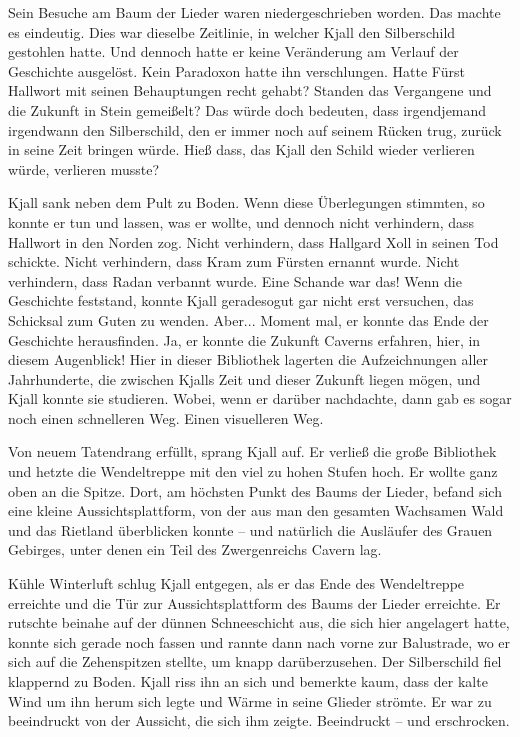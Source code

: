 \documentclass[10pt, a4paper, oneside]{book}
\begin{document}
Sein Besuche am Baum der Lieder waren niedergeschrieben worden. Das machte es eindeutig. Dies war dieselbe Zeitlinie, in welcher Kjall den Silberschild gestohlen hatte. Und dennoch hatte er keine Veränderung am Verlauf der Geschichte ausgelöst. Kein Paradoxon hatte ihn verschlungen. Hatte Fürst Hallwort mit seinen Behauptungen recht gehabt? Standen das Vergangene und die Zukunft in Stein gemeißelt? Das würde doch bedeuten, dass irgendjemand irgendwann den Silberschild, den er immer noch auf seinem Rücken trug, zurück in seine Zeit bringen würde. Hieß dass, das Kjall den Schild wieder verlieren würde, verlieren musste?

Kjall sank neben dem Pult zu Boden. Wenn diese Überlegungen stimmten, so konnte er tun und lassen, was er wollte, und dennoch nicht verhindern, dass Hallwort in den Norden zog. Nicht verhindern, dass Hallgard Xoll in seinen Tod schickte. Nicht verhindern, dass Kram zum Fürsten ernannt wurde. Nicht verhindern, dass Radan verbannt wurde. Eine Schande war das! Wenn die Geschichte feststand, konnte Kjall geradesogut gar nicht erst versuchen, das Schicksal zum Guten zu wenden. Aber... Moment mal, er konnte das Ende der Geschichte herausfinden. Ja, er konnte die Zukunft Caverns erfahren, hier, in diesem Augenblick! Hier in dieser Bibliothek lagerten die Aufzeichnungen aller Jahrhunderte, die zwischen Kjalls Zeit und dieser Zukunft liegen mögen, und Kjall konnte sie studieren. Wobei, wenn er darüber nachdachte, dann gab es sogar noch einen schnelleren Weg. Einen visuelleren Weg.

Von neuem Tatendrang erfüllt, sprang Kjall auf. Er verließ die große Bibliothek und hetzte die Wendeltreppe mit den viel zu hohen Stufen hoch. Er wollte ganz oben an die Spitze. Dort, am höchsten Punkt des Baums der Lieder, befand sich eine kleine Aussichtsplattform, von der aus man den gesamten Wachsamen Wald und das Rietland überblicken konnte – und natürlich die Ausläufer des Grauen Gebirges, unter denen ein Teil des Zwergenreichs Cavern lag.\bigskip



Kühle Winterluft schlug Kjall entgegen, als er das Ende des Wendeltreppe erreichte und die Tür zur Aussichtsplattform des Baums der Lieder erreichte. Er rutschte beinahe auf der dünnen Schneeschicht aus, die sich hier angelagert hatte, konnte sich gerade noch fassen und rannte dann nach vorne zur Balustrade, wo er sich auf die Zehenspitzen stellte, um knapp darüberzusehen. Der Silberschild fiel klappernd zu Boden. Kjall riss ihn an sich und bemerkte kaum, dass der kalte Wind um ihn herum sich legte und Wärme in seine Glieder strömte. Er war zu beeindruckt von der Aussicht, die sich ihm zeigte. Beeindruckt – und erschrocken.\bigskip
\end{document}
